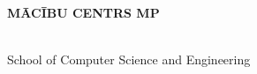 \makeatletter
\begin{titlepage}
\begin{center}

\uppercase{\textbf{\large{Mācību Centrs MP}}}
\\[7cm]

\uppercase{\textbf{\large{\@title}}}

\vfill
\@author
\\[3cm]

School of Computer Science and Engineering

\@date

\end{center}
\end{titlepage}
\makeatother